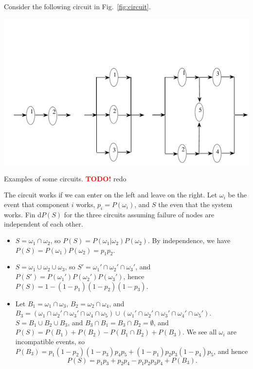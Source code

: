 \documentclass[letter-paper]{tufte-book}
\newcommand{\TODO}{\textcolor{red}{\bf TODO!}\xspace}
\newenvironment{example}[1][Example]{\begin{trivlist}
\item[\hskip \labelsep {\bfseries #1}]}{\end{trivlist}}
\begin{document}
\begin{example}
  Consider the following circuit in Fig.~\ref{fig:circuit}.
  
  \begin{marginfigure}
    \includegraphics{circuit}
    \caption{Examples of some circuits. \TODO redo}
    \label{fig:circuit}
  \end{marginfigure}
  
  The circuit works if we can enter on the left and leave on the right. Let
  $\omega_i$ be the event that component $i$ works, $p_i=P(\omega_i)$, and $S$
  the even that the system works. Fin d$P(S)$ for the three circuits assuming
  failure of nodes are independent of each other.
  \begin{itemize}
    \item $S=\omega_1 \cap\omega_2$, so $P(S)=P(\omega_1 |\omega_2)P(\omega_2)$.
    By independence, we have $P(S)=P(\omega_1)P(\omega_2)=p_1 p_2$.
    
    \item $S=\omega_1 \cup\omega_2 \cup\omega_3$, so $S'=\omega_1' \cap\omega_2'
    \cap\omega_3'$, and $P(S')=P(\omega_1')P(\omega_2')P(\omega_3')$, hence
    $P(S)=1-(1-p_1)(1-p_2)(1-p_3)$.
    
    \item Let $B_1=\omega_1\cap \omega_3$, $B_2=\omega_2\cap\omega_4$, and
    $B_3=(\omega_1\cap\omega_2'\cap\omega_3'\cap\omega_4\cap\omega_5) \cup 
    (\omega_1'\cap\omega_2'\cap\omega_3'\cap\omega_4'\cap\omega_5')$. $S=B_1\cup
    B_2\cup B_3$, and $B_3\cap B_1=B_3\cap B_2=\emptyset$, and
    $P(S)=P(B_1)+P(B_2)-P(B_1\cap B_2)+P(B_3)$. We see all $\omega_i$ are
    incompatible events, so $P(B_3)=p_1 (1-p_2)(1-p_3)p_4 p_5 + (1-p_1) p_2 p_3
    (1-p_4) p_5$, and hence
    \begin{equation*}
      P(S)=p_1 p_3 + p_2 p_4 - p_1 p_2 p_3 p_4 + P(B_3).
    \end{equation*}
  \end{itemize}
\end{example}
\end{document}
